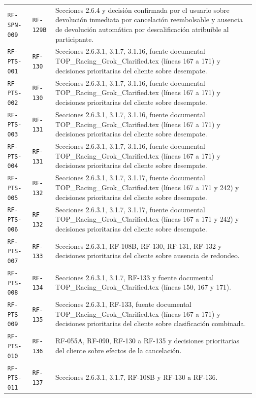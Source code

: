 \documentclass[10pt,letterpaper]{article}
\begin{document}
\begin{landscape}
\begin{longtable}{P{2.7cm}P{2.6cm}P{15.7cm}}
\texttt{RF-SPN-009} & \texttt{RF-129B} & Secciones 2.6.4 y decisión confirmada por el usuario sobre devolución inmediata por cancelación reembolsable y ausencia de devolución automática por descalificación atribuible al participante.\\
\texttt{RF-PTS-001} & \texttt{RF-130} & Secciones 2.6.3.1, 3.1.7, 3.1.16, fuente documental TOP\_Racing\_Grok\_Clarified.tex (líneas 167 a 171) y decisiones prioritarias del cliente sobre desempate.\\
\texttt{RF-PTS-002} & \texttt{RF-130} & Secciones 2.6.3.1, 3.1.7, 3.1.16, fuente documental TOP\_Racing\_Grok\_Clarified.tex (líneas 167 a 171) y decisiones prioritarias del cliente sobre desempate.\\
\texttt{RF-PTS-003} & \texttt{RF-131} & Secciones 2.6.3.1, 3.1.7, 3.1.16, fuente documental TOP\_Racing\_Grok\_Clarified.tex (líneas 167 a 171) y decisiones prioritarias del cliente sobre desempate.\\
\texttt{RF-PTS-004} & \texttt{RF-131} & Secciones 2.6.3.1, 3.1.7, 3.1.16, fuente documental TOP\_Racing\_Grok\_Clarified.tex (líneas 167 a 171) y decisiones prioritarias del cliente sobre desempate.\\
\texttt{RF-PTS-005} & \texttt{RF-132} & Secciones 2.6.3.1, 3.1.7, 3.1.17, fuente documental TOP\_Racing\_Grok\_Clarified.tex (líneas 167 a 171 y 242) y decisiones prioritarias del cliente sobre desempate.\\
\texttt{RF-PTS-006} & \texttt{RF-132} & Secciones 2.6.3.1, 3.1.7, 3.1.17, fuente documental TOP\_Racing\_Grok\_Clarified.tex (líneas 167 a 171 y 242) y decisiones prioritarias del cliente sobre desempate.\\
\texttt{RF-PTS-007} & \texttt{RF-133} & Secciones 2.6.3.1, RF-108B, RF-130, RF-131, RF-132 y decisiones prioritarias del cliente sobre ausencia de redondeo.\\
\texttt{RF-PTS-008} & \texttt{RF-134} & Secciones 2.6.3.1, 3.1.7, RF-133 y fuente documental TOP\_Racing\_Grok\_Clarified.tex (líneas 150, 167 y 171).\\
\texttt{RF-PTS-009} & \texttt{RF-135} & Secciones 2.6.3.1, RF-133, fuente documental TOP\_Racing\_Grok\_Clarified.tex (líneas 167 a 171) y decisiones prioritarias del cliente sobre clasificación combinada.\\
\texttt{RF-PTS-010} & \texttt{RF-136} & RF-055A, RF-090, RF-130 a RF-135 y decisiones prioritarias del cliente sobre efectos de la cancelación.\\
\texttt{RF-PTS-011} & \texttt{RF-137} & Secciones 2.6.3.1, 3.1.7, RF-108B y RF-130 a RF-136.\\

\end{longtable}
\end{landscape}
\end{document}
